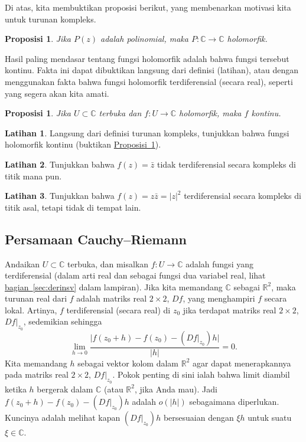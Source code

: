 \documentclass[12pt,openany]{book}
\newcommand{\sabs}[1]{\lvert {#1} \rvert}
\newcommand{\C}{{\mathbb{C}}}
\newcommand{\R}{{\mathbb{R}}}
\theoremstyle{plain}
\newtheorem{prop}[thm]{Proposisi}
\theoremstyle{remark}
\theoremstyle{definition}
\newenvironment{exbox}{%
    \def\FrameCommand{\vrule width 1pt \relax\hspace{10pt}}%
    \MakeFramed{\advance\hsize-\width\FrameRestore}%
}{%
    \endMakeFramed
}
\theoremstyle{exercise}
\newtheorem{exercise}{Latihan}[section]
\theoremstyle{example}
\newcommand{\sectionref}[1]{\hyperref[#1]{bagian~\ref*{#1}}}
\newcommand{\propref}[1]{\hyperref[#1]{Proposisi~\ref*{#1}}}
\begin{document}
Di atas, kita membuktikan proposisi berikut, yang membenarkan motivasi kita
untuk turunan kompleks.

\begin{prop}
Jika $P(z)$ adalah polinomial, maka $P \colon \C \to \C$ holomorfik.
\end{prop}

Hasil paling mendasar tentang fungsi holomorfik adalah bahwa fungsi tersebut
kontinu.
Fakta ini dapat dibuktikan langsung dari definisi (latihan),
atau dengan menggunakan fakta bahwa fungsi holomorfik
terdiferensial (secara real), seperti yang segera akan kita amati.

\begin{prop} \label{prop:holiscont}
Jika $U \subset \C$ terbuka dan $f \colon U \to \C$ holomorfik, maka $f$
kontinu.
\end{prop}

\begin{exbox}
\begin{exercise}
Langsung dari definisi turunan kompleks, tunjukkan bahwa
fungsi holomorfik kontinu (buktikan \propref{prop:holiscont}).
\end{exercise}

\begin{exercise}
Tunjukkan bahwa $f(z) = \bar{z}$ tidak terdiferensial secara kompleks di titik mana pun.
\end{exercise}

\begin{exercise}
Tunjukkan bahwa $f(z) = z \bar{z} = \sabs{z}^2$ terdiferensial secara kompleks
di titik asal, tetapi tidak di tempat lain.
\end{exercise}
\end{exbox}

\subsection{Persamaan Cauchy--Riemann}

Andaikan $U \subset \C$ terbuka, dan
misalkan $f \colon U \to \C$ adalah fungsi yang
terdiferensial (dalam arti real
dan sebagai fungsi dua variabel real,
lihat \sectionref{sec:derinsv} dalam lampiran).
Jika kita memandang $\C$ sebagai $\R^2$,
maka turunan real dari $f$ adalah matriks real $2 \times 2$, $D f$,
yang menghampiri $f$ secara lokal.
Artinya, $f$ terdiferensial (secara real) di $z_0$ jika terdapat
matriks real $2 \times 2$, $Df|_{z_0}$, sedemikian sehingga
\begin{equation*}
\lim_{h \to 0} \frac{\sabs{f(z_0+h) - f(z_0) - (Df|_{z_0}) h}}{\sabs{h}} = 0 .
\end{equation*}
Kita memandang $h$ sebagai vektor kolom dalam $\R^2$
agar dapat menerapkannya pada
matriks real $2 \times 2$, $Df|_{z_0}$.
Pokok penting di sini ialah bahwa limit diambil
ketika $h$ bergerak dalam $\C$ (atau $\R^2$, jika Anda mau).
Jadi $f(z_0+h) - f(z_0) - (Df|_{z_0}) h$ adalah $o(\sabs{h})$ sebagaimana diperlukan.
Kuncinya adalah melihat kapan $(Df|_{z_0}) h$ bersesuaian dengan $\xi h$
untuk suatu $\xi \in \C$.
\end{document}
